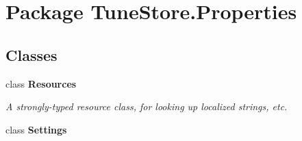 \hypertarget{namespace_tune_store_1_1_properties}{\section{Package Tune\+Store.\+Properties}
\label{namespace_tune_store_1_1_properties}
}
\subsection*{Classes}
\begin{DoxyCompactItemize}
\item 
class {\bfseries Resources}
\begin{DoxyCompactList}\small\item\em A strongly-\/typed resource class, for looking up localized strings, etc. \end{DoxyCompactList}\item 
class {\bfseries Settings}
\end{DoxyCompactItemize}
